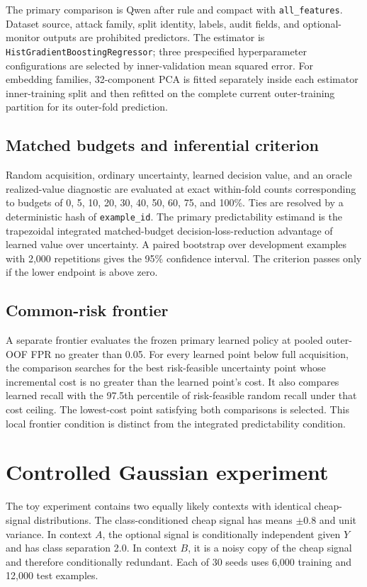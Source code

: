 \documentclass[11pt,a4paper]{article}
\newcommand{\code}[1]{\texttt{#1}}
\begin{document}
The primary comparison is Qwen after rule and compact with \code{all\_features}. Dataset source, attack family, split identity, labels, audit fields, and optional-monitor outputs are prohibited predictors. The estimator is \code{HistGradientBoostingRegressor}; three prespecified hyperparameter configurations are selected by inner-validation mean squared error. For embedding families, 32-component PCA is fitted separately inside each estimator inner-training split and then refitted on the complete current outer-training partition for its outer-fold prediction.

\subsection{Matched budgets and inferential criterion}

Random acquisition, ordinary uncertainty, learned decision value, and an oracle realized-value diagnostic are evaluated at exact within-fold counts corresponding to budgets of 0, 5, 10, 20, 30, 40, 50, 60, 75, and 100\%. Ties are resolved by a deterministic hash of \code{example\_id}. The primary predictability estimand is the trapezoidal integrated matched-budget decision-loss-reduction advantage of learned value over uncertainty. A paired bootstrap over development examples with 2,000 repetitions gives the 95\% confidence interval. The criterion passes only if the lower endpoint is above zero.

\subsection{Common-risk frontier}

A separate frontier evaluates the frozen primary learned policy at pooled outer-OOF FPR no greater than 0.05. For every learned point below full acquisition, the comparison searches for the best risk-feasible uncertainty point whose incremental cost is no greater than the learned point's cost. It also compares learned recall with the 97.5th percentile of risk-feasible random recall under that cost ceiling. The lowest-cost point satisfying both comparisons is selected. This local frontier condition is distinct from the integrated predictability condition.

\section{Controlled Gaussian experiment}

The toy experiment contains two equally likely contexts with identical cheap-signal distributions. The class-conditioned cheap signal has means $\pm0.8$ and unit variance. In context $A$, the optional signal is conditionally independent given $Y$ and has class separation 2.0. In context $B$, it is a noisy copy of the cheap signal and therefore conditionally redundant. Each of 30 seeds uses 6,000 training and 12,000 test examples.
\end{document}
